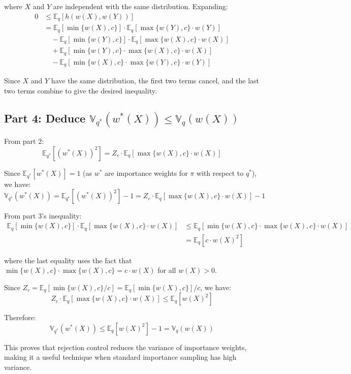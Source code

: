 where $X$ and $Y$ are independent with the same distribution. Expanding:
\begin{align}
0 &\leq \mathbb{E}_q[h(w(X), w(Y))] \\
&= \mathbb{E}_q[\min\{w(X), c\}] \cdot \mathbb{E}_q[\max\{w(Y), c\} \cdot w(Y)] \\
&\quad - \mathbb{E}_q[\min\{w(Y), c\}] \cdot \mathbb{E}_q[\max\{w(X), c\} \cdot w(X)] \\
&\quad + \mathbb{E}_q[\min\{w(Y), c\} \cdot \max\{w(X), c\} \cdot w(X)] \\
&\quad - \mathbb{E}_q[\min\{w(X), c\} \cdot \max\{w(Y), c\} \cdot w(Y)]
\end{align}

Since $X$ and $Y$ have the same distribution, the first two terms cancel, and the last two terms combine to give the desired inequality.

\subsection*{Part 4: Deduce $\mathbb{V}_{q^*}(w^*(X)) \leq \mathbb{V}_q(w(X))$}

From part 2: 
\begin{equation}
\mathbb{E}_{q^*}[(w^*(X))^2] = Z_c \cdot \mathbb{E}_q[\max\{w(X), c\} \cdot w(X)]
\end{equation}

Since $\mathbb{E}_{q^*}[w^*(X)] = 1$ (as $w^*$ are importance weights for $\pi$ with respect to $q^*$), we have:
\begin{equation}
\mathbb{V}_{q^*}(w^*(X)) = \mathbb{E}_{q^*}[(w^*(X))^2] - 1 = Z_c \cdot \mathbb{E}_q[\max\{w(X), c\} \cdot w(X)] - 1
\end{equation}

From part 3's inequality:
\begin{align}
\mathbb{E}_q[\min\{w(X), c\}] \cdot \mathbb{E}_q[\max\{w(X), c\} \cdot w(X)] &\leq \mathbb{E}_q[\min\{w(X), c\} \cdot \max\{w(X), c\} \cdot w(X)] \\
&= \mathbb{E}_q[c \cdot w(X)^2]
\end{align}

where the last equality uses the fact that $\min\{w(X), c\} \cdot \max\{w(X), c\} = c \cdot w(X)$ for all $w(X) > 0$.

Since $Z_c = \mathbb{E}_q[\min\{w(X), c\}/c] = \mathbb{E}_q[\min\{w(X), c\}]/c$, we have:
\begin{equation}
Z_c \cdot \mathbb{E}_q[\max\{w(X), c\} \cdot w(X)] \leq \mathbb{E}_q[w(X)^2]
\end{equation}

Therefore:
\begin{equation}
\mathbb{V}_{q^*}(w^*(X)) \leq \mathbb{E}_q[w(X)^2] - 1 = \mathbb{V}_q(w(X))
\end{equation}

This proves that rejection control reduces the variance of importance weights, making it a useful technique when standard importance sampling has high variance.